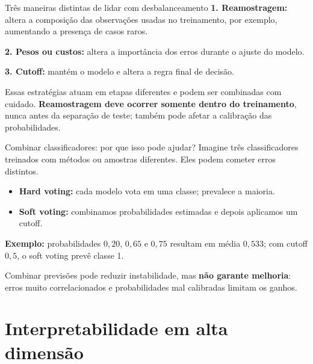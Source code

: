 \documentclass[
  10pt,
  ignorenonframetext,
  aspectratio=169,
  brazilian,
]{beamer}
\providecommand{\tightlist}{%
  \setlength{\itemsep}{0pt}\setlength{\parskip}{0pt}}
\begin{document}
\begin{frame}{Três maneiras distintas de lidar com desbalanceamento}
\protect{}\label{truxeas-maneiras-distintas-de-lidar-com-desbalanceamento}
\textbf{1. Reamostragem:} altera a composição das observações usadas no
treinamento, por exemplo, aumentando a presença de casos raros.

\textbf{2. Pesos ou custos:} altera a importância dos erros durante o
ajuste do modelo.

\textbf{3. Cutoff:} mantém o modelo e altera a regra final de decisão.

Essas estratégias atuam em etapas diferentes e podem ser combinadas com
cuidado. \textbf{Reamostragem deve ocorrer somente dentro do
treinamento}, nunca antes da separação de teste; também pode afetar a
calibração das probabilidades.
\end{frame}

\begin{frame}{Combinar classificadores: por que isso pode ajudar?}
\protect{}\label{combinar-classificadores-por-que-isso-pode-ajudar}
Imagine três classificadores treinados com métodos ou amostras
diferentes. Eles podem cometer erros distintos.

\begin{itemize}
\tightlist
\item
  \textbf{Hard voting:} cada modelo vota em uma classe; prevalece a
  maioria.
\item
  \textbf{Soft voting:} combinamos probabilidades estimadas e depois
  aplicamos um cutoff.
\end{itemize}

\textbf{Exemplo:} probabilidades \(0{,}20\), \(0{,}65\) e \(0{,}75\)
resultam em média \(0{,}533\); com cutoff \(0{,}5\), o soft voting prevê
classe 1.

Combinar previsões pode reduzir instabilidade, mas \textbf{não garante
melhoria}: erros muito correlacionados e probabilidades mal calibradas
limitam os ganhos.
\end{frame}

\section{Interpretabilidade em alta
dimensão}\label{interpretabilidade-em-alta-dimensuxe3o}
\end{document}
